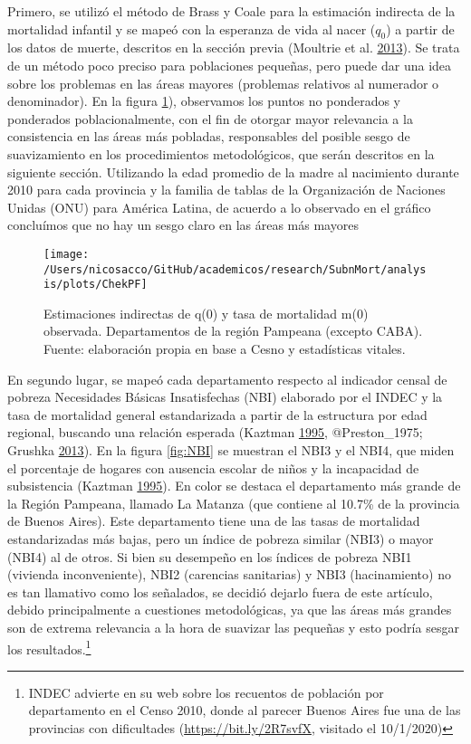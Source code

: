 \documentclass[12pt,]{article}
\begin{document}
Primero, se utilizó el método de Brass y Coale para la estimación
indirecta de la mortalidad infantil y se mapeó con la esperanza de vida
al nacer (\(q_0\)) a partir de los datos de muerte, descritos en la
sección previa (Moultrie et al. \protect\hyperlink{ref-Moultrie}{2013}).
Se trata de un método poco preciso para poblaciones pequeñas, pero puede
dar una idea sobre los problemas en las áreas mayores (problemas
relativos al numerador o denominador). En la figura \ref{fig:PF}),
observamos los puntos no ponderados y ponderados poblacionalmente, con
el fin de otorgar mayor relevancia a la consistencia en las áreas más
pobladas, responsables del posible sesgo de suavizamiento en los
procedimientos metodológicos, que serán descritos en la siguiente
sección. Utilizando la edad promedio de la madre al nacimiento durante
2010 para cada provincia y la familia de tablas de la Organización de
Naciones Unidas (ONU) para América Latina, de acuerdo a lo observado en
el gráfico concluímos que no hay un sesgo claro en las áreas más mayores

\begin{figure}

{\centering \texttt{[image: /Users/nicosacco/GitHub/academicos/research/SubnMort/analysis/plots/ChekPF]} 

}

\caption{Estimaciones indirectas de q(0) y tasa de mortalidad m(0) observada. Departamentos de la región Pampeana (excepto CABA). Fuente: elaboración propia en base a Cesno y estadísticas vitales.}\label{fig:PF}
\end{figure}

En segundo lugar, se mapeó cada departamento respecto al indicador
censal de pobreza Necesidades Básicas Insatisfechas (NBI) elaborado por
el INDEC y la tasa de mortalidad general estandarizada a partir de la
estructura por edad regional, buscando una relación esperada (Kaztman
\protect\hyperlink{ref-Kaztman1995}{1995}, @Preston\_1975; Grushka
\protect\hyperlink{ref-Grushka2013}{2013}). En la figura \ref{fig:NBI}
se muestran el NBI3 y el NBI4, que miden el porcentaje de hogares con
ausencia escolar de niños y la incapacidad de subsistencia (Kaztman
\protect\hyperlink{ref-Kaztman1995}{1995}). En color se destaca el
departamento más grande de la Región Pampeana, llamado La Matanza (que
contiene al 10.7\% de la provincia de Buenos Aires). Este departamento
tiene una de las tasas de mortalidad estandarizadas más bajas, pero un
índice de pobreza similar (NBI3) o mayor (NBI4) al de otros. Si bien su
desempeño en los índices de pobreza NBI1 (vivienda inconveniente), NBI2
(carencias sanitarias) y NBI3 (hacinamiento) no es tan llamativo como
los señalados, se decidió dejarlo fuera de este artículo, debido
principalmente a cuestiones metodológicas, ya que las áreas más grandes
son de extrema relevancia a la hora de suavizar las pequeñas y esto
podría sesgar los resultados.\footnote{INDEC advierte en su web sobre
  los recuentos de población por departamento en el Censo 2010, donde al
  parecer Buenos Aires fue una de las provincias con dificultades
  (\url{https://bit.ly/2R7svfX}, visitado el 10/1/2020)}
\end{document}
